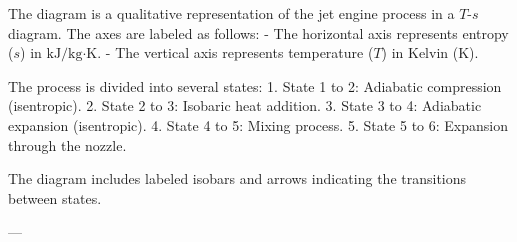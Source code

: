 The diagram is a qualitative representation of the jet engine process in a \( T \)-\( s \) diagram. The axes are labeled as follows:  
- The horizontal axis represents entropy (\( s \)) in \( \text{kJ}/\text{kg·K} \).  
- The vertical axis represents temperature (\( T \)) in Kelvin (\( \text{K} \)).  

The process is divided into several states:  
1. State 1 to 2: Adiabatic compression (isentropic).  
2. State 2 to 3: Isobaric heat addition.  
3. State 3 to 4: Adiabatic expansion (isentropic).  
4. State 4 to 5: Mixing process.  
5. State 5 to 6: Expansion through the nozzle.  

The diagram includes labeled isobars and arrows indicating the transitions between states.  

---